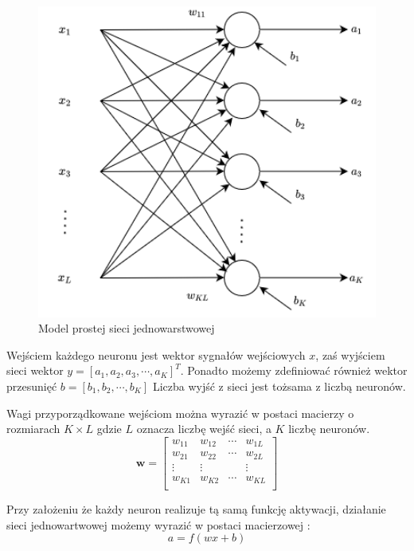 \documentclass[12pt,twoside]{article}
\begin{document}
\begin{figure}[ht]
	\centering
	\includegraphics[width=12cm]{figures/models/singleLayerModel.png}
	\caption{Model prostej sieci jednowarstwowej \cite{kiaSingleLayer}}
	\label{Fig:singleNetwork}
\end{figure}

Wejściem każdego neuronu jest wektor sygnałów wejściowych $x$, zaś wyjściem sieci wektor $y = \left[ a_1, a_2, a_3, \cdots, a_K \right]^T$.
Ponadto możemy zdefiniować również wektor przesunięć $b = \left[ b_1, b_2, \cdots, b_K \right]$
Liczba wyjść z sieci jest tożsama z liczbą neuronów.

Wagi przyporządkowane wejściom można wyrazić w postaci macierzy o rozmiarach $K \times L$ gdzie $L$ oznacza liczbę wejść sieci, a $K$ liczbę neuronów. \cite{kiaSingleLayer}
$$\bm{w} = \left[
	\begin{array}{cccc}
		w_{11} & w_{12} & \cdots & w_{1L} \\
		w_{21} & w_{22} & \cdots & w_{2L} \\
		\vdots & \vdots &  & \vdots \\
		w_{K1} & w_{K2} & \cdots & w_{KL} \\
	\end{array}
	\right]$$

Przy założeniu że każdy neuron realizuje tą samą funkcję aktywacji, działanie sieci jednowartwowej możemy wyrazić w postaci macierzowej \cite{kiaSingleLayer}:
\begin{equation}
	\label{eq:singleLayerOut}
	a = f\left( wx + b \right)
\end{equation}
\end{document}
